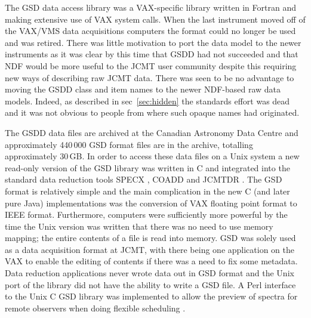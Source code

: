 \documentclass[final,authoryear,5p,times,twocolumn]{elsarticle}
\newcommand{\ascl}[1]{\href{http://www.ascl.net/#1}{ascl:#1}}
\begin{document}
The GSD data access library was a VAX-specific library
\citep{1986QJRAS..27..675.,mtdn84} written in Fortran and making
extensive use of VAX system calls. When the last instrument moved off
of the VAX/VMS data acquisitions computers the format could no longer
be used and was retired. There was little motivation to port the data
model to the newer instruments as it was clear by this time that GSDD
had not succeeded and that NDF would be more useful to the JCMT user
community despite this requiring new ways of describing raw JCMT
data. There was seen to be no advantage to moving the GSDD class and
item names to the newer NDF-based raw data models. Indeed, as
described in sec~\ref{sec:hidden} the standards effort was dead and it
was not obvious to people from where such opaque names had originated.

The GSDD data files are archived at the Canadian Astronomy Data
Centre and approximately 440\,000 GSD format files are in the
archive, totalling approximately 30\,GB. In order to access these data
files on a Unix system a new read-only version of the GSD library was
written in C \citep[][\ascl{1503.009}]{SUN229} and integrated into the standard data
reduction tools SPECX \citep[][\ascl{1310.008}]{SPECX,1990JCMTP...9...25P}, COADD
\citep[][\ascl{1411.020}]{COADD}  and JCMTDR
\citep[][\ascl{1406.019}]{SUN132}.  The GSD format is relatively
simple and the main complication in the new C (and later pure Java)
implementations was the conversion of VAX floating point format to
IEEE format. Furthermore, computers were sufficiently more powerful
by the time the Unix version was written that there was no need to use
memory mapping; the entire contents of a file is read into memory.
GSD was solely used as a data acquisition format at JCMT, with there
being one application on the VAX to enable the editing of contents if
there was a need to fix some metadata. Data reduction applications
never wrote data out in GSD format and the Unix port of the library
did not have the ability to write a GSD file.
A Perl interface to the Unix C GSD library \citep{1999ASPC..172..494J}
was implemented to allow the preview of spectra for remote observers
when doing flexible scheduling \citep{1997ASPC..125..401J}.
\end{document}
